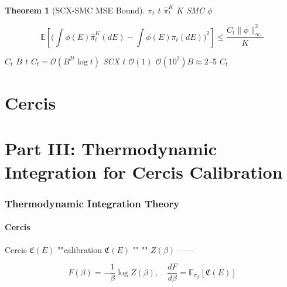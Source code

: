 \documentclass[12pt,a4paper]{article}
\theoremstyle{plain}
\newtheorem{theorem}{ Theorem}[section]
\theoremstyle{definition}
\newcommand{\E}{\mathbb{E}}
\newcommand{\Ocal}{\mathcal{O}}
\newcommand{\Cercis}{\mathfrak{C}}
\begin{document}
\subsection{}

\begin{theorem}[SCX-SMC  MSE Bound]
 $\pi_t$  $t$ $\hat{\pi}_t^K$  $K$  SMC 
 $\phi$

\begin{equation}\label{eq:mse_bound}
    \E\!\left[ \Big( \int \phi(E) \hat{\pi}_t^K(dE) - \int \phi(E) \pi_t(dE) \Big)^2 \right] \leq \frac{C_t \|\phi\|_\infty^2}{K}
\end{equation}

 $C_t$  $B$ $t$
$C_t = \Ocal(B^{2t} \log t)$ SCX $t$  $\Ocal(1)$ 
$\Ocal(10^2)$$B \approx 2$–$5$ $C_t$ 
\end{theorem}

\newpage


\part{Cercis }
\part*{Part III: Thermodynamic Integration for Cercis Calibration}

\section{}
\section*{Thermodynamic Integration Theory}

\subsection{Cercis }

Cercis  $\Cercis(E)$ ""\textbf{}calibration
$\Cercis(E)$ ""
"" $Z(\beta)$ ——

\begin{equation}\label{eq:free_energy}
    F(\beta) = -\frac{1}{\beta} \log Z(\beta),\quad
    \frac{dF}{d\beta} = \E_{\pi_\beta}[\Cercis(E)]
\end{equation}
\end{document}
